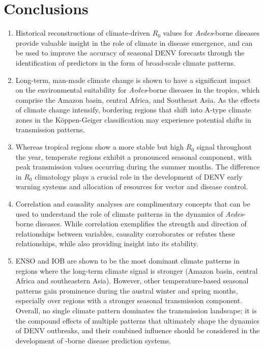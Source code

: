 \documentclass[10pt,twocolumn]{wlscirep}
\begin{document}
\section{Conclusions} \label{sec-conclusions}

\begin{enumerate}
  \item Historical reconstructions of climate-driven $R_0$ values for \textit{Aedes}-borne diseases provide valuable insight in the role of climate in disease emergence, and can be used to improve the accuracy of seasonal DENV forecasts through the identification of predictors in the form of broad-scale climate patterns.
  \item Long-term, man-made climate change is shown to have a significant impact on the environmental suitability for \textit{Aedes}-borne diseases in the tropics, which comprise the Amazon basin, central Africa, and Southeast Asia. As the effects of climate change intensify, bordering regions that shift into A-type climate zones in the Köppen-Geiger classification may experience potential shifts in transmission patterns.
  \item Whereas tropical regions show a more stable but high $R_0$ signal throughout the year, temperate regions exhibit a pronounced seasonal component, with peak transmission values occurring during the summer months. The difference in $R_0$ climatology plays a crucial role in the development of DENV early warning systems and allocation of resources for vector and disease control.
  \item Correlation and causality analyses are complimentary concepts that can be used to understand the role of climate patterns in the dynamics of \textit{Aedes}-borne diseases. While correlation exemplifies the strength and direction of relationships between variables, causality corroborates or refutes these relationships, while also providing insight into its stability.
  \item ENSO and IOB are shown to be the most dominant climate patterns in regions where the long-term climate signal is stronger (Amazon basin, central Africa and southeastern Asia). However, other temperature-based seasonal patterns gain prominence during the austral winter and spring months, especially over regions with a stronger seasonal transmission component. Overall, no single climate pattern dominates the transmission landscape; it is the compound effects of multiple patterns that ultimately shape the dynamics of DENV outbreaks, and their combined influence should be considered in the development of -borne disease prediction systems.

\end{enumerate}
\end{document}
